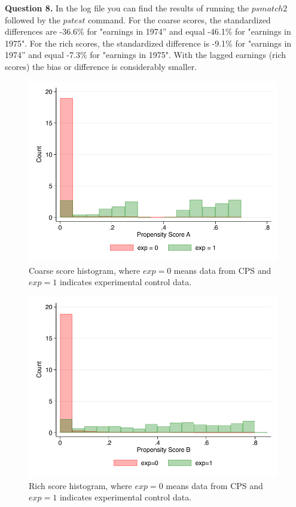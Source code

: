 \documentclass{article}
\theoremstyle{definition}
\begin{document}
\hspace{0.41cm} \textbf{Question 8.} In the log file you can find the results of running the $psmatch2$ followed by the $pstest$ command.  For the coarse scores, the standardized
differences are -36.6\% for "earnings in 1974” and equal -46.1\% for "earnings in 1975". For the rich scores, the standardized
difference is -9.1\% for "earnings in 1974” and equal -7.3\% for "earnings in 1975". With the lagged earnings (rich scores) the bias or difference is considerably smaller. 


 
\begin{figure}[h]
\centering
\includegraphics[width=11cm]{imgs/pscorea_hist.pdf}
\caption{Coarse score histogram, where $exp=0$ means data from CPS and $exp=1$ indicates experimental control data.}
\end{figure}

\begin{figure}[h]
\centering
\includegraphics[width=11cm]{imgs/pscoreb_hist.pdf}
\caption{Rich score histogram, where $exp=0$ means data from CPS and $exp=1$ indicates experimental control data.}
\end{figure}
\end{document}
